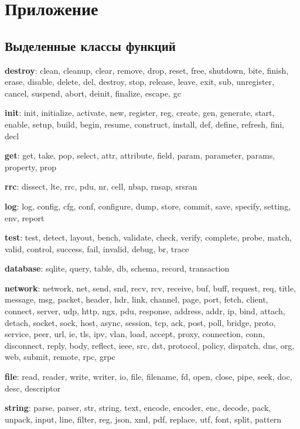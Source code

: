 \section{Приложение}

\subsection{Выделенные классы функций}

\textbf{destroy}: clean, cleanup, clear, remove, drop, reset, free, shutdown, bite, finish, erase, disable, delete, del, destroy, stop, release, leave, exit, sub, unregister, cancel, suspend, abort, deinit, finalize, escape, gc

\textbf{init}: init, initialize, activate, new, register, reg, create, gen, generate, start, enable, setup, build, begin, resume, construct, install, def, define, refresh, fini, decl

\textbf{get}: get, take, pop, select, attr, attribute, field, param, parameter, params, property, prop

\textbf{rrc}: dissect, lte, rrc, pdu, nr, cell, nbap, rnsap, srsran

\textbf{log}: log, config, cfg, conf, configure, dump, store, commit, save, specify, setting, env, report

\textbf{test}: test, detect, layout, bench, validate, check, verify, complete, probe, match, valid, control, success, fail, invalid, debug, br, trace

\textbf{database}: sqlite, query, table, db, schema, record, transaction

\textbf{network}: network, net, send, snd, recv, rcv, receive, buf, buff, request, req, title, message, msg, packet, header, hdr, link, channel, page, port, fetch, client, connect, server, udp, http, ngx, pdu, response, address, addr, ip, bind, attach, detach, socket, sock, host, async, session, tcp, ack, post, poll, bridge, proto, service, peer, url, ie, tls, ipv, vlan, load, accept, proxy, connection, conn, disconnect, reply, body, reflect, ieee, src, dst, protocol, policy, dispatch, dns, org, web, submit, remote, rpc, grpc

\textbf{file}: read, reader, write, writer, io, file, filename, fd, open, close, pipe, seek, doc, desc, descriptor

\textbf{string}: parse, parser, str, string, text, encode, encoder, enc, decode, pack, unpack, input, line, filter, reg, json, xml, pdf, replace, utf, font, split, pattern

